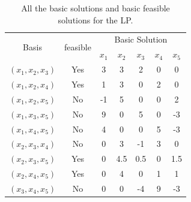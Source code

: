 \documentclass[12pt]{article}
\begin{document}
\begin{enumerate}
\begin{enumerate}
                        \begin{table}[H]
                              \centering
                              \begin{tabular}{|c|c|c|c|c|c|c|}
                                    \hline
                                    \multirow{2}{*}{Basis} & \multirow{2}{*}{feasible} & \multicolumn{5}{|c|}{Basic Solution}                                 \\
                                    \cline{3-7}            &                           & $x_1$                                & $x_2$ & $x_3$ & $x_4$ & $x_5$ \\
                                    \hline
                                    $(x_1,x_2,x_3)$        & Yes                       & 3                                    & 3     & 2     & 0     & 0     \\
                                    $(x_1,x_2,x_4)$        & Yes                       & 1                                    & 3     & 0     & 2     & 0     \\
                                    $(x_1,x_2,x_5)$        & No                        & -1                                   & 5     & 0     & 0     & 2     \\
                                    $(x_1,x_3,x_5)$        & No                        & 9                                    & 0     & 5     & 0     & -3    \\
                                    $(x_1,x_4,x_5)$        & No                        & 4                                    & 0     & 0     & 5     & -3    \\
                                    $(x_2,x_3,x_4)$        & No                        & 0                                    & 3     & -1    & 3     & 0     \\
                                    $(x_2,x_3,x_5)$        & Yes                       & 0                                    & 4.5   & 0.5   & 0     & 1.5   \\
                                    $(x_2,x_4,x_5)$        & Yes                       & 0                                    & 4     & 0     & 1     & 1     \\
                                    $(x_3,x_4,x_5)$        & No                        & 0                                    & 0     & -4    & 9     & -3    \\
                                    \hline
                              \end{tabular}
                              \caption{All the basic solutions and basic feasible solutions for the LP.}
                              \label{tab:1}
                        \end{table}


\end{enumerate}
\end{enumerate}
\end{document}
